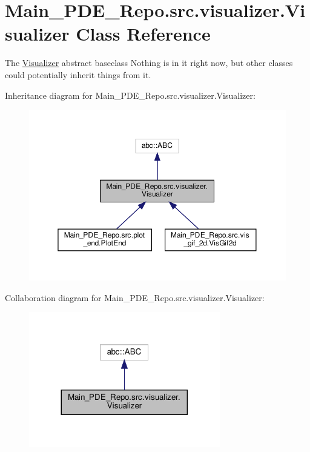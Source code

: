 \hypertarget{classMain__PDE__Repo_1_1src_1_1visualizer_1_1Visualizer}{}\section{Main\+\_\+\+P\+D\+E\+\_\+\+Repo.\+src.\+visualizer.\+Visualizer Class Reference}
\label{classMain__PDE__Repo_1_1src_1_1visualizer_1_1Visualizer}


The \hyperlink{classMain__PDE__Repo_1_1src_1_1visualizer_1_1Visualizer}{Visualizer} abstract baseclass Nothing is in it right now, but other classes could potentially inherit things from it.  




Inheritance diagram for Main\+\_\+\+P\+D\+E\+\_\+\+Repo.\+src.\+visualizer.\+Visualizer\+:
\nopagebreak
\begin{figure}[H]
\begin{center}
\leavevmode
\includegraphics[width=350pt]{classMain__PDE__Repo_1_1src_1_1visualizer_1_1Visualizer__inherit__graph}
\end{center}
\end{figure}


Collaboration diagram for Main\+\_\+\+P\+D\+E\+\_\+\+Repo.\+src.\+visualizer.\+Visualizer\+:
\nopagebreak
\begin{figure}[H]
\begin{center}
\leavevmode
\includegraphics[width=236pt]{classMain__PDE__Repo_1_1src_1_1visualizer_1_1Visualizer__coll__graph}
\end{center}
\end{figure}


